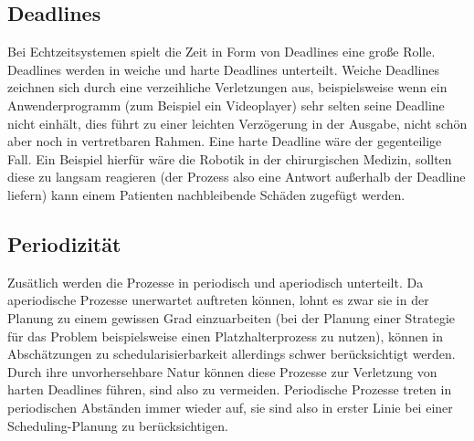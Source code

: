 \subsection{Deadlines}
Bei Echtzeitsystemen spielt die Zeit in Form von Deadlines eine große Rolle. Deadlines werden in weiche und harte Deadlines unterteilt. Weiche Deadlines zeichnen sich durch eine verzeihliche Verletzungen aus, beispielsweise wenn ein Anwenderprogramm (zum Beispiel ein Videoplayer) sehr selten seine Deadline nicht einhält, dies führt zu einer leichten Verzögerung in der Ausgabe, nicht schön aber noch in vertretbaren Rahmen. Eine harte Deadline wäre der gegenteilige Fall. Ein Beispiel hierfür wäre die Robotik in der chirurgischen Medizin, sollten diese zu langsam reagieren (der Prozess also eine Antwort außerhalb der Deadline liefern) kann einem Patienten nachbleibende Schäden zugefügt werden. 

\subsection{Periodizität}
Zusätlich werden die Prozesse in periodisch und aperiodisch unterteilt. Da aperiodische Prozesse unerwartet auftreten können, lohnt es zwar sie in der Planung zu einem gewissen Grad einzuarbeiten (bei der Planung einer Strategie für das Problem beispielsweise einen Platzhalterprozess zu nutzen), können in Abschätzungen zu schedularisierbarkeit allerdings schwer berücksichtigt werden. Durch ihre unvorhersehbare Natur können diese Prozesse zur Verletzung von harten Deadlines führen, sind also zu vermeiden. Periodische Prozesse treten in periodischen Abständen immer wieder auf, sie sind also in erster Linie bei einer Scheduling-Planung zu berücksichtigen.


